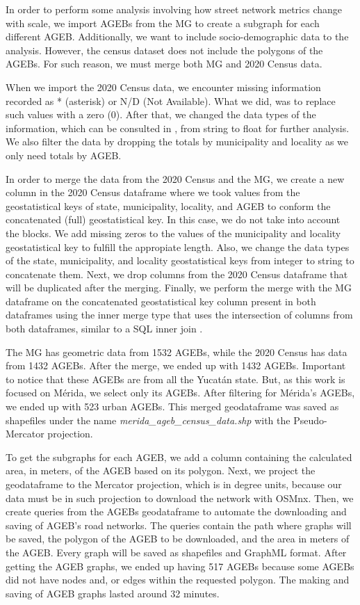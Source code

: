 In order to perform some analysis involving how street network metrics change with scale, we import AGEBs from the MG to create a subgraph for each different AGEB. Additionally, we want to include socio-demographic data to the analysis. However, the census dataset does not include the polygons of the AGEBs. For such reason, we must merge both MG and 2020 Census data.

When we import the 2020 Census data, we encounter missing information recorded as * (asterisk) or N/D (Not Available). What we did, was to replace such values with a zero (0). After that, we changed the data types of the information, which can be consulted in \cite{census_data}, from string to float for further analysis. We also filter the data by dropping the totals by municipality and locality as we only need totals by AGEB.

In order to merge the data from the 2020 Census and the MG, we create a new column in the 2020 Census dataframe where we took values from the geostatistical keys of state, municipality, locality, and AGEB to conform the concatenated (full) geostatistical key. In this case, we do not take into account the blocks. We add missing zeros to the values of the municipality and locality geostatistical key to fulfill the appropiate length. Also, we change the data types of the state, municipality, and locality geostatistical keys from integer to string to concatenate them. Next, we drop columns from the 2020 Census dataframe that will be duplicated after the merging. Finally, we perform the merge with the MG dataframe on the concatenated geostatistical key column present in both dataframes using the inner merge type that uses the intersection of columns from both dataframes, similar to a SQL inner join \cite{pandas_merge}.

The MG has geometric data from 1532 AGEBs, while the 2020 Census has data from 1432 AGEBs. After the merge, we ended up with 1432 AGEBs. Important to notice that these AGEBs are from all the Yucatán state. But, as this work is focused on Mérida, we select only its AGEBs. After filtering for Mérida's AGEBs, we ended up with 523 urban AGEBs. This merged geodataframe was saved as shapefiles under the name \textit{merida\_ageb\_census\_data.shp} with the Pseudo-Mercator projection.

To get the subgraphs for each AGEB, we add a column containing the calculated area, in meters, of the AGEB based on its polygon. Next, we project the geodataframe to the Mercator projection, which is in degree units, because our data must be in such projection to download the network with OSMnx. Then, we create queries from the AGEBs geodataframe to automate the downloading and saving of AGEB's road networks. The queries contain the path where graphs will be saved, the polygon of the AGEB to be downloaded, and the area in meters of the AGEB. Every graph will be saved as shapefiles and GraphML format. After getting the AGEB graphs, we ended up having 517 AGEBs because some AGEBs did not have nodes and, or edges within the requested polygon. The making and saving of AGEB graphs lasted around 32 minutes.

